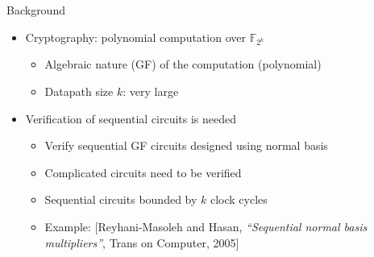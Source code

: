 \documentclass[xcolor=dvipsnames]{beamer}
\newcommand{\Fkk}{{\mathbb{F}}_{2^k}}
\newcommand{\bi}{\begin{itemize}}
\newcommand{\ei}{\end{itemize}}
\begin{document}
\begin{frame}{\large{Background}}
\bi
\item Cryptography: polynomial computation over $\Fkk$
	\bi
	\item Algebraic nature (GF) of the computation (polynomial)
	\item Datapath size $k$: very large
	\ei
\vspace{5mm}
\item Verification of sequential circuits is needed
	\bi
	\item Verify sequential GF circuits designed using normal basis
	\item Complicated circuits need to be verified
	\item Sequential circuits bounded by $k$ clock cycles
	\item Example: [Reyhani-Masoleh and Hasan, \textit{“Sequential normal basis multipliers”}, Trans on Computer, 2005]
	\ei
\ei
\end{frame}
\end{document}
